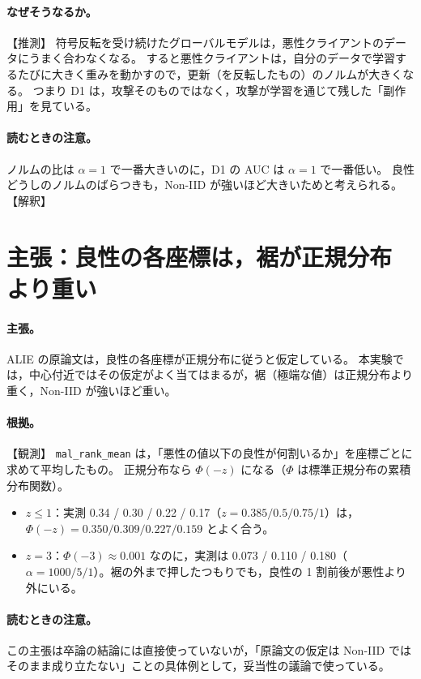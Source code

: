 \documentclass[a4j, dvipdfmx]{jsarticle}  %
\begin{document}
\paragraph{なぜそうなるか。}【推測】
符号反転を受け続けたグローバルモデルは，悪性クライアントのデータにうまく合わなくなる。
すると悪性クライアントは，自分のデータで学習するたびに大きく重みを動かすので，更新（を反転したもの）のノルムが大きくなる。
つまり D1 は，攻撃そのものではなく，攻撃が学習を通じて残した「副作用」を見ている。

\paragraph{読むときの注意。}
ノルムの比は $\alpha = 1$ で一番大きいのに，D1 の AUC は $\alpha = 1$ で一番低い。
良性どうしのノルムのばらつきも，Non-IID が強いほど大きいためと考えられる。【解釈】

\section{主張：良性の各座標は，裾が正規分布より重い}
\label{sec:claim-tail}

\paragraph{主張。}
ALIE の原論文は，良性の各座標が正規分布に従うと仮定している。
本実験では，中心付近ではその仮定がよく当てはまるが，裾（極端な値）は正規分布より重く，Non-IID が強いほど重い。

\paragraph{根拠。}【観測】
\texttt{mal\_rank\_mean} は，「悪性の値以下の良性が何割いるか」を座標ごとに求めて平均したもの。
正規分布なら $\Phi(-z)$ になる（$\Phi$ は標準正規分布の累積分布関数）。
\begin{itemize}
  \item $z \le 1$：実測 0.34 / 0.30 / 0.22 / 0.17（$z = 0.385 / 0.5 / 0.75 / 1$）は，$\Phi(-z) = 0.350 / 0.309 / 0.227 / 0.159$ とよく合う。
  \item $z = 3$：$\Phi(-3) \approx 0.001$ なのに，実測は 0.073 / 0.110 / 0.180（$\alpha = 1000 / 5 / 1$）。裾の外まで押したつもりでも，良性の 1 割前後が悪性より外にいる。
\end{itemize}

\paragraph{読むときの注意。}
この主張は卒論の結論には直接使っていないが，「原論文の仮定は Non-IID ではそのまま成り立たない」ことの具体例として，妥当性の議論で使っている。
\end{document}

